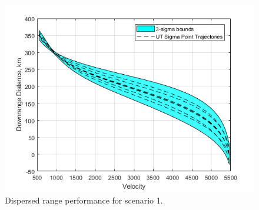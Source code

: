 \documentclass[letterpaper, paper,11pt]{AAS}
\begin{document}
\begin{figure}[h!]
	\centering
	\includegraphics[width=1\textwidth]{ddp/matlab/RobustTrajRange}
	\caption{Dispersed range performance for scenario 1.}
	\label{fig_robust_range}
\end{figure}
\end{document}
